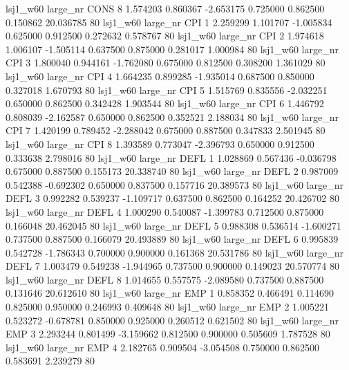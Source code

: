     lsj1_w60   large_nr     CONS                 8  1.574203  0.860367  -2.653175 0.725000 0.862500  0.150862   20.036785 80
    lsj1_w60   large_nr      CPI                 1  2.259299  1.101707  -1.005834 0.625000 0.912500  0.272632    0.578767 80
    lsj1_w60   large_nr      CPI                 2  1.974618  1.006107  -1.505114 0.637500 0.875000  0.281017    1.000984 80
    lsj1_w60   large_nr      CPI                 3  1.800040  0.944161  -1.762080 0.675000 0.812500  0.308200    1.361029 80
    lsj1_w60   large_nr      CPI                 4  1.664235  0.899285  -1.935014 0.687500 0.850000  0.327018    1.670793 80
    lsj1_w60   large_nr      CPI                 5  1.515769  0.835556  -2.032251 0.650000 0.862500  0.342428    1.903544 80
    lsj1_w60   large_nr      CPI                 6  1.446792  0.808039  -2.162587 0.650000 0.862500  0.352521    2.188034 80
    lsj1_w60   large_nr      CPI                 7  1.420199  0.789452  -2.288042 0.675000 0.887500  0.347833    2.501945 80
    lsj1_w60   large_nr      CPI                 8  1.393589  0.773047  -2.396793 0.650000 0.912500  0.333638    2.798016 80
    lsj1_w60   large_nr     DEFL                 1  1.028869  0.567436  -0.036798 0.675000 0.887500  0.155173   20.338740 80
    lsj1_w60   large_nr     DEFL                 2  0.987009  0.542388  -0.692302 0.650000 0.837500  0.157716   20.389573 80
    lsj1_w60   large_nr     DEFL                 3  0.992282  0.539237  -1.109717 0.637500 0.862500  0.164252   20.426702 80
    lsj1_w60   large_nr     DEFL                 4  1.000290  0.540087  -1.399783 0.712500 0.875000  0.166048   20.462045 80
    lsj1_w60   large_nr     DEFL                 5  0.988308  0.536514  -1.600271 0.737500 0.887500  0.166079   20.493889 80
    lsj1_w60   large_nr     DEFL                 6  0.995839  0.542728  -1.786343 0.700000 0.900000  0.161368   20.531786 80
    lsj1_w60   large_nr     DEFL                 7  1.003479  0.549238  -1.944965 0.737500 0.900000  0.149023   20.570774 80
    lsj1_w60   large_nr     DEFL                 8  1.014655  0.557575  -2.089580 0.737500 0.887500  0.131646   20.612610 80
    lsj1_w60   large_nr      EMP                 1  0.858352  0.466491   0.114690 0.825000 0.950000  0.246993    0.409648 80
    lsj1_w60   large_nr      EMP                 2  1.005221  0.523272  -0.678781 0.850000 0.925000  0.260512    0.621502 80
    lsj1_w60   large_nr      EMP                 3  2.293244  0.801499  -3.159662 0.812500 0.900000  0.505609    1.787528 80
    lsj1_w60   large_nr      EMP                 4  2.182765  0.909504  -3.054508 0.750000 0.862500  0.583691    2.239279 80
